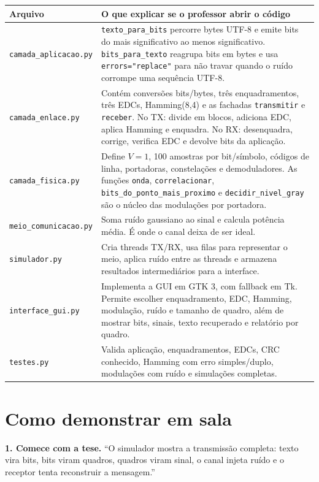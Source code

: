 \documentclass[10pt,a4paper]{article}
\newcommand{\arquivo}[1]{\texttt{#1}}
\newcommand{\codigo}[1]{\texttt{#1}}
\begin{document}
\begin{center}
\small
\begin{tabularx}{\linewidth}{p{3.2cm}Y}
\toprule
\textbf{Arquivo} & \textbf{O que explicar se o professor abrir o código} \\
\midrule
\arquivo{camada\_aplicacao.py} & \codigo{texto\_para\_bits} percorre bytes UTF-8 e emite bits do mais significativo ao menos significativo. \codigo{bits\_para\_texto} reagrupa bits em bytes e usa \codigo{errors="replace"} para não travar quando o ruído corrompe uma sequência UTF-8. \\
\arquivo{camada\_enlace.py} & Contém conversões bits/bytes, três enquadramentos, três EDCs, Hamming(8,4) e as fachadas \codigo{transmitir} e \codigo{receber}. No TX: divide em blocos, adiciona EDC, aplica Hamming e enquadra. No RX: desenquadra, corrige, verifica EDC e devolve bits da aplicação. \\
\arquivo{camada\_fisica.py} & Define \(V=1\), 100 amostras por bit/símbolo, códigos de linha, portadoras, constelações e demoduladores. As funções \codigo{onda}, \codigo{correlacionar}, \codigo{bits\_do\_ponto\_mais\_proximo} e \codigo{decidir\_nivel\_gray} são o núcleo das modulações por portadora. \\
\arquivo{meio\_comunicacao.py} & Soma ruído gaussiano ao sinal e calcula potência média. É onde o canal deixa de ser ideal. \\
\arquivo{simulador.py} & Cria threads TX/RX, usa filas para representar o meio, aplica ruído entre as threads e armazena resultados intermediários para a interface. \\
\arquivo{interface\_gui.py} & Implementa a GUI em GTK 3, com fallback em Tk. Permite escolher enquadramento, EDC, Hamming, modulação, ruído e tamanho de quadro, além de mostrar bits, sinais, texto recuperado e relatório por quadro. \\
\arquivo{testes.py} & Valida aplicação, enquadramentos, EDCs, CRC conhecido, Hamming com erro simples/duplo, modulações com ruído e simulações completas. \\
\bottomrule
\end{tabularx}
\end{center}

\section{Como demonstrar em sala}

\textbf{1. Comece com a tese.} ``O simulador mostra a transmissão completa: texto vira bits, bits viram quadros, quadros viram sinal, o canal injeta ruído e o receptor tenta reconstruir a mensagem.''
\end{document}
